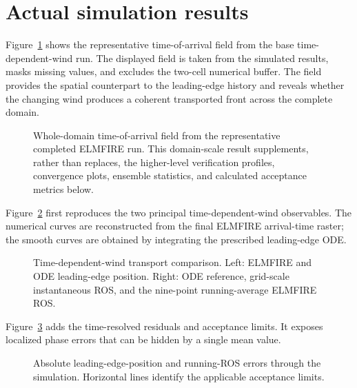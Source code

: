 \section{Actual simulation results}

Figure~\ref{fig:domain-result} shows the representative time-of-arrival field from the base time-dependent-wind run.
The displayed field is taken from the simulated results, masks missing values, and excludes
the two-cell numerical buffer.  The field provides the spatial counterpart to the leading-edge history and reveals whether the changing wind produces a coherent transported front across the complete domain.

\begin{figure}[H]
\centering
{}
\caption{Whole-domain time-of-arrival field from the representative completed ELMFIRE run.  This
domain-scale result supplements, rather than replaces, the higher-level verification
profiles, convergence plots, ensemble statistics, and calculated acceptance metrics below.}
\label{fig:domain-result}
\end{figure}

Figure~\ref{fig:time-dependent-wind} first reproduces the two principal
time-dependent-wind observables. The numerical curves are reconstructed from
the final ELMFIRE arrival-time raster; the smooth curves are obtained by
integrating the prescribed leading-edge ODE.

\begin{figure}[H]
\centering
{}
\caption{Time-dependent-wind transport comparison. Left: ELMFIRE and ODE
leading-edge position. Right: ODE reference, grid-scale instantaneous ROS, and
the nine-point running-average ELMFIRE ROS.}
\label{fig:time-dependent-wind}
\end{figure}

Figure~\ref{fig:time-dependent-errors} adds the time-resolved residuals and
acceptance limits. It exposes localized phase errors that can be hidden by a
single mean value.

\begin{figure}[H]
\centering
{}
\caption{Absolute leading-edge-position and running-ROS errors through the
simulation. Horizontal lines identify the applicable acceptance limits.}
\label{fig:time-dependent-errors}
\end{figure}

